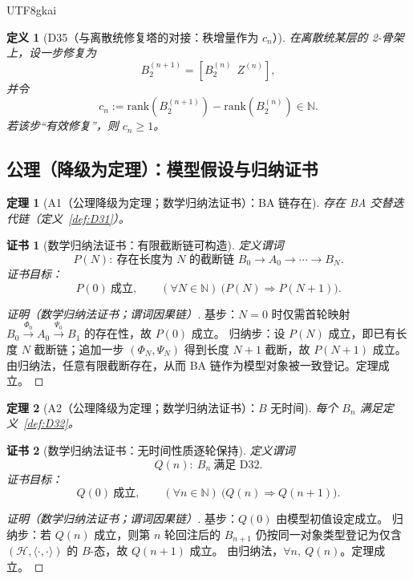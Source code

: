 \documentclass[12pt]{article}
\newtheorem{definition}{定义}[section]
\newtheorem{theorem}{定理}[section]
\newtheorem{Certificate}{证书}[section]
\begin{document}
\begin{CJK*}{UTF8}{gkai}
\begin{definition}[D35（与离散统修复塔的对接：秩增量作为 $c_n$）]
\label{def:D35}
在离散统某层的 2-骨架上，设一步修复为
\[
B_2^{(n+1)}=[B_2^{(n)}\ \ Z^{(n)}],
\]
并令
\[
c_n:=\mathrm{rank}(B_2^{(n+1)})-\mathrm{rank}(B_2^{(n)})\in\mathbb N.
\]
若该步“有效修复”，则 $c_n\ge 1$。
\end{definition}

\subsection{公理（降级为定理）：模型假设与归纳证书}

\begin{theorem}[A1（公理降级为定理；数学归纳法证书）：BA 链存在]
\label{thm:A1-ba3}
存在 BA 交替迭代链（定义~\ref{def:D31}）。
\end{theorem}

\begin{Certificate}[数学归纳法证书：有限截断链可构造]
\label{cert:A1-ba3}
定义谓词
\[
P(N):\ \text{存在长度为 }N\text{ 的截断链 }B_0\to A_0\to\cdots\to B_N.
\]
证书目标：
\[
P(0)\ \text{成立},\qquad (\forall N\in\mathbb N)\ \bigl(P(N)\Rightarrow P(N+1)\bigr).
\]
\end{Certificate}

\begin{proof}[证明（数学归纳法证书；谓词因果链）]
基步：$N=0$ 时仅需首轮映射 $B_0\xrightarrow{\Phi_0}A_0\xrightarrow{\Psi_0}B_1$ 的存在性，故 $P(0)$ 成立。
归纳步：设 $P(N)$ 成立，即已有长度 $N$ 截断链；追加一步 $(\Phi_N,\Psi_N)$ 得到长度 $N+1$ 截断，故 $P(N+1)$ 成立。
由归纳法，任意有限截断存在，从而 BA 链作为模型对象被一致登记。定理成立。
\end{proof}

\begin{theorem}[A2（公理降级为定理；数学归纳法证书）：$B$ 无时间]
\label{thm:A2-ba3}
每个 $B_n$ 满足定义~\ref{def:D32}。
\end{theorem}

\begin{Certificate}[数学归纳法证书：无时间性质逐轮保持]
\label{cert:A2-ba3}
定义谓词
\[
Q(n):\ B_n\ \text{满足 D32}.
\]
证书目标：
\[
Q(0)\ \text{成立},\qquad (\forall n\in\mathbb N)\ \bigl(Q(n)\Rightarrow Q(n+1)\bigr).
\]
\end{Certificate}

\begin{proof}[证明（数学归纳法证书；谓词因果链）]
基步：$Q(0)$ 由模型初值设定成立。
归纳步：若 $Q(n)$ 成立，则第 $n$ 轮回注后的 $B_{n+1}$ 仍按同一对象类型登记为仅含 $(\mathcal H,\langle\cdot,\cdot\rangle)$ 的 $B$-态，故 $Q(n+1)$ 成立。
由归纳法，$\forall n,\ Q(n)$。定理成立。
\end{proof}


\end{CJK*}
\end{document}
